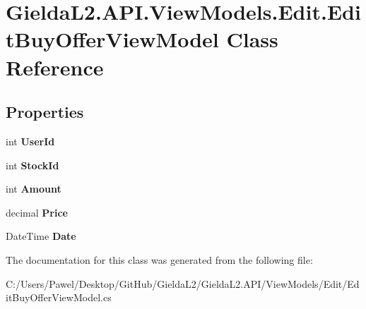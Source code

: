 \hypertarget{class_gielda_l2_1_1_a_p_i_1_1_view_models_1_1_edit_1_1_edit_buy_offer_view_model}{}\section{Gielda\+L2.\+A\+P\+I.\+View\+Models.\+Edit.\+Edit\+Buy\+Offer\+View\+Model Class Reference}
\label{class_gielda_l2_1_1_a_p_i_1_1_view_models_1_1_edit_1_1_edit_buy_offer_view_model}
\subsection*{Properties}
\begin{DoxyCompactItemize}
\item 
\mbox{\label{class_gielda_l2_1_1_a_p_i_1_1_view_models_1_1_edit_1_1_edit_buy_offer_view_model_a219999affd6dd789e9fbfdb9fcb8e095}} 
int {\bfseries User\+Id}
\item 
\mbox{\label{class_gielda_l2_1_1_a_p_i_1_1_view_models_1_1_edit_1_1_edit_buy_offer_view_model_afb9a704a3af49a05577bb11fcd248b68}} 
int {\bfseries Stock\+Id}
\item 
\mbox{\label{class_gielda_l2_1_1_a_p_i_1_1_view_models_1_1_edit_1_1_edit_buy_offer_view_model_a4cf13f8377d6ea84e460a186f37892a6}} 
int {\bfseries Amount}
\item 
\mbox{\label{class_gielda_l2_1_1_a_p_i_1_1_view_models_1_1_edit_1_1_edit_buy_offer_view_model_aeb5f1392c1524e748674e1d0be9c1448}} 
decimal {\bfseries Price}
\item 
\mbox{\label{class_gielda_l2_1_1_a_p_i_1_1_view_models_1_1_edit_1_1_edit_buy_offer_view_model_a1834f6048606cd00b7548ee4657deda8}} 
Date\+Time {\bfseries Date}
\end{DoxyCompactItemize}


The documentation for this class was generated from the following file\+:\begin{DoxyCompactItemize}
\item 
C\+:/\+Users/\+Pawel/\+Desktop/\+Git\+Hub/\+Gielda\+L2/\+Gielda\+L2.\+A\+P\+I/\+View\+Models/\+Edit/Edit\+Buy\+Offer\+View\+Model.\+cs\end{DoxyCompactItemize}
